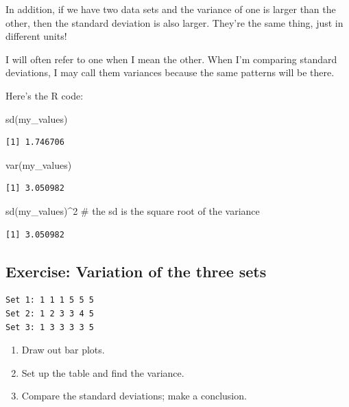 \documentclass[
  letterpaper,
  DIV=11,
  numbers=noendperiod,
  oneside]{scrreprt}
\newenvironment{Shaded}{\begin{snugshade}}{\end{snugshade}}
\newcommand{\CommentTok}[1]{\textcolor[rgb]{0.37,0.37,0.37}{#1}}
\newcommand{\DecValTok}[1]{\textcolor[rgb]{0.68,0.00,0.00}{#1}}
\newcommand{\FunctionTok}[1]{\textcolor[rgb]{0.28,0.35,0.67}{#1}}
\newcommand{\NormalTok}[1]{\textcolor[rgb]{0.00,0.23,0.31}{#1}}
\newcommand{\SpecialCharTok}[1]{\textcolor[rgb]{0.37,0.37,0.37}{#1}}
\providecommand{\tightlist}{%
  \setlength{\itemsep}{0pt}\setlength{\parskip}{0pt}}\usepackage{longtable,booktabs,array}
\begin{document}
In addition, if we have two data sets and the variance of one is larger
than the other, then the standard deviation is also larger. They're the
same thing, just in different units!

I will often refer to one when I mean the other. When I'm comparing
standard deviations, I may call them variances because the same patterns
will be there.

Here's the R code:

\begin{Shaded}
\begin{Highlighting}[]
\FunctionTok{sd}\NormalTok{(my\_values)}
\end{Highlighting}
\end{Shaded}

\begin{verbatim}
[1] 1.746706
\end{verbatim}

\begin{Shaded}
\begin{Highlighting}[]
\FunctionTok{var}\NormalTok{(my\_values)}
\end{Highlighting}
\end{Shaded}

\begin{verbatim}
[1] 3.050982
\end{verbatim}

\begin{Shaded}
\begin{Highlighting}[]
\FunctionTok{sd}\NormalTok{(my\_values)}\SpecialCharTok{\^{}}\DecValTok{2} \CommentTok{\# the sd is the square root of the variance}
\end{Highlighting}
\end{Shaded}

\begin{verbatim}
[1] 3.050982
\end{verbatim}

\hypertarget{exercise-variation-of-the-three-sets}{%
\subsection{Exercise: Variation of the three
sets}\label{exercise-variation-of-the-three-sets}}

\begin{verbatim}
Set 1: 1 1 1 5 5 5
Set 2: 1 2 3 3 4 5
Set 3: 1 3 3 3 3 5
\end{verbatim}

\begin{enumerate}
\def\labelenumi{\arabic{enumi}.}
\tightlist
\item
  Draw out bar plots.
\item
  Set up the table and find the variance.
\item
  Compare the standard deviations; make a conclusion.
\end{enumerate}
\end{document}
